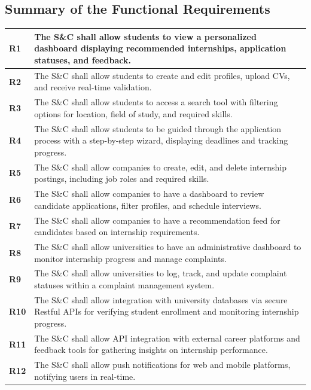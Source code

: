 \subsection{Summary of the Functional Requirements}
\begin{longtable}{|p{}|p{}|}
\hline
\textbf{R1} & The S\&C shall allow students to view a personalized dashboard displaying recommended internships, application statuses, and feedback. \\ 
\hline
\textbf{R2} & The S\&C shall allow students to create and edit profiles, upload CVs, and receive real-time validation. \\ 
\hline
\textbf{R3} & The S\&C shall allow students to access a search tool with filtering options for location, field of study, and required skills. \\ 
\hline
\textbf{R4} & The S\&C shall allow students to be guided through the application process with a step-by-step wizard, displaying deadlines and tracking progress. \\ 
\hline
\textbf{R5} & The S\&C shall allow companies to create, edit, and delete internship postings, including job roles and required skills. \\ 
\hline
\textbf{R6} & The S\&C shall allow companies to have a dashboard to review candidate applications, filter profiles, and schedule interviews. \\ 
\hline
\textbf{R7} & The S\&C shall allow companies to have a recommendation feed for candidates based on internship requirements. \\ 
\hline
\textbf{R8} & The S\&C shall allow universities to have an administrative dashboard to monitor internship progress and manage complaints. \\ 
\hline
\textbf{R9} & The S\&C shall allow universities to log, track, and update complaint statuses within a complaint management system. \\ 
\hline
\textbf{R10} & The S\&C shall allow integration with university databases via secure Restful APIs for verifying student enrollment and monitoring internship progress. \\ 
\hline
\textbf{R11} & The S\&C shall allow API integration with external career platforms and feedback tools for gathering insights on internship performance. \\ 
\hline
\textbf{R12} & The S\&C shall allow push notifications for web and mobile platforms, notifying users in real-time. \\ 
\hline

\end{longtable}
